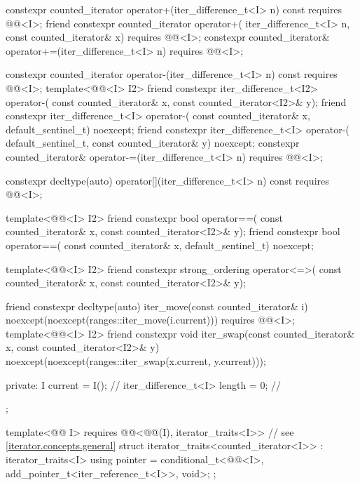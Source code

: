 \begin{codeblock}
{{    constexpr counted_iterator operator+(iter_difference_t<I> n) const
      requires @@<I>;
    friend constexpr counted_iterator operator+(
      iter_difference_t<I> n, const counted_iterator& x)
        requires @@<I>;
    constexpr counted_iterator& operator+=(iter_difference_t<I> n)
      requires @@<I>;

    constexpr counted_iterator operator-(iter_difference_t<I> n) const
      requires @@<I>;
    template<@@<I> I2>
      friend constexpr iter_difference_t<I2> operator-(
        const counted_iterator& x, const counted_iterator<I2>& y);
    friend constexpr iter_difference_t<I> operator-(
      const counted_iterator& x, default_sentinel_t) noexcept;
    friend constexpr iter_difference_t<I> operator-(
      default_sentinel_t, const counted_iterator& y) noexcept;
    constexpr counted_iterator& operator-=(iter_difference_t<I> n)
      requires @@<I>;

    constexpr decltype(auto) operator[](iter_difference_t<I> n) const
      requires @@<I>;

    template<@@<I> I2>
      friend constexpr bool operator==(
        const counted_iterator& x, const counted_iterator<I2>& y);
    friend constexpr bool operator==(
      const counted_iterator& x, default_sentinel_t) noexcept;

    template<@@<I> I2>
      friend constexpr strong_ordering operator<=>(
        const counted_iterator& x, const counted_iterator<I2>& y);

    friend constexpr decltype(auto) iter_move(const counted_iterator& i)
      noexcept(noexcept(ranges::iter_move(i.current)))
        requires @@<I>;
    template<@@<I> I2>
      friend constexpr void iter_swap(const counted_iterator& x, const counted_iterator<I2>& y)
        noexcept(noexcept(ranges::iter_swap(x.current, y.current)));

  private:
    I current = I();                    // \expos
    iter_difference_t<I> length = 0;    // \expos
  };

  template<@@ I>
    requires @@<@@(I), iterator_traits<I>>   // see \ref{iterator.concepts.general}
  struct iterator_traits<counted_iterator<I>> : iterator_traits<I> {
    using pointer = conditional_t<@@<I>,
                                  add_pointer_t<iter_reference_t<I>>, void>;
  };
}
\end{codeblock}

